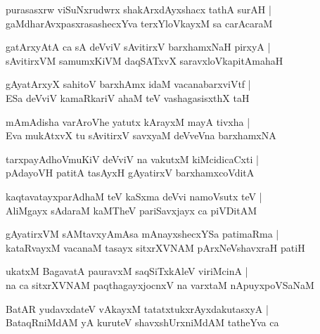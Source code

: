 \begin{shloka}
purasasxrw viSuNxrudwrx shakArxdAyxshacx tathA surAH |\\
gaMdharAvxpasxrasashecxYva terxYloVkayxM sa carAcaraM 
\end{shloka}

\begin{shloka}
gatArxyAtA ca sA deVviV sAvitirxV barxhamxNaH pirxyA |\\
sAvitirxVM samumxKiVM daqSATxvX saravxloVkapitAmahaH 
\end{shloka}

\begin{shloka}
gAyatArxyX sahitoV barxhAmx idaM vacanabarxviVtf |\\
ESa deVviV kamaRkariV ahaM teV vashagasisxthX taH 
\end{shloka}

\begin{shloka}
mAmAdisha varAroVhe yatutx kArayxM mayA tivxha |\\
Eva mukAtxvX tu sAvitirxV savxyaM deVveVna barxhamxNA
\end{shloka}

\begin{shloka}
tarxpayAdhoVmuKiV deVviV na vakutxM kiMcidicaCxti |\\
pAdayoVH patitA tasAyxH gAyatirxV barxhamxcoVditA 
\end{shloka}

\begin{shloka}
kaqtavatayxparAdhaM teV kaSxma deVvi namoVsutx teV |\\
AliMgayx sAdaraM kaMTheV pariSavxjayx ca piVDitAM
\end{shloka}

\begin{shloka}
gAyatirxVM sAMtavxyAmAsa mAnayxshecxYSa patimaRma |\\
kataRvayxM vacanaM tasayx sitxrXVNAM pArxNeVshavxraH patiH
\end{shloka}

\begin{shloka}
ukatxM BagavatA pauravxM saqSiTxkAleV viriMcinA |\\
na ca sitxrXVNAM paqthagayxjocnxV na varxtaM nApuyxpoVSaNaM
\end{shloka}

\begin{shloka}
BatAR yudavxdateV vAkayxM tatatxtukxrAyxdakutasxyA |\\
BataqRniMdAM yA kuruteV shavxshUrxniMdAM tatheYva ca 
\end{shloka}

